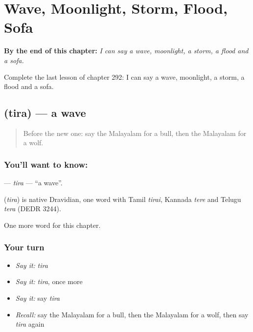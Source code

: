 
\chapter{Wave, Moonlight, Storm, Flood, Sofa}
\label{ch:ml-wave-moonlight-storm-flood-sofa}

\begin{chapteropening}
\textbf{By the end of this chapter:} \emph{I can say a wave, moonlight, a storm, a flood and a sofa.}

Complete the last lesson of chapter 292: I can say a wave, moonlight, a storm, a flood and a sofa.
\end{chapteropening}

\section[\texorpdfstring{\ml{തിര} (tira)}{തിര (tira)}]{ (tira) — a wave}

\label{lesson:ML-C292-tira}



\begin{quote}
Before the new one: say the Malayalam for a bull, then the Malayalam for a wolf.
\end{quote}

\subsection*{You'll want to know: }
\textbf{} — \emph{tira} — \textquotedblleft{}a wave\textquotedblright{}.

\begin{cousinweb}
\textbf{} (\emph{tira}) is native Dravidian, one word with Tamil \emph{tirai}, Kannada \emph{tere} and Telugu \emph{tera} (DEDR 3244).
\end{cousinweb}

\begin{grammarlens}[title={What you've built}]
One more word for this chapter.
\end{grammarlens}

\subsection*{Your turn}
\begin{itemize}
\raggedright
  \item \emph{Say it:} \emph{tira}
  \item \emph{Say it:} \emph{tira}, once more
  \item \emph{Say it:} say \emph{tira}
  \item \emph{Recall:} say the Malayalam for a bull, then the Malayalam for a wolf, then say \emph{tira} again
\end{itemize}

